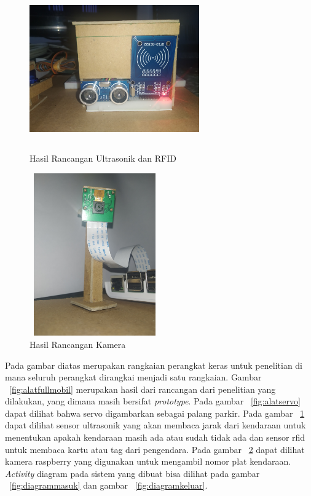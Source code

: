 \begin{figure} [H]
    \includegraphics[height=7cm, width=0.65\textwidth, center]{images/alat-ultra&rfid.jpg}
    \caption{Hasil Rancangan Ultrasonik dan RFID}
    \label{fig:alatultrarfid}
\end{figure}

\begin{figure} [H]
    \includegraphics[height=7cm, width=0.5\textwidth, center]{images/alat-kamera.jpg}
    \caption{Hasil Rancangan Kamera}
    \label{fig:alatkamera}
\end{figure}

Pada gambar diatas merupakan rangkaian perangkat keras untuk penelitian di mana seluruh perangkat dirangkai menjadi satu rangkaian.  Gambar ~\ref{fig:alatfullmobil} merupakan hasil dari rancangan dari penelitian yang dilakukan, yang dimana masih bersifat \textit{prototype}. Pada gambar ~\ref{fig:alatservo} dapat dilihat bahwa servo digambarkan sebagai palang parkir. Pada gambar ~\ref{fig:alatultrarfid} dapat dilihat sensor ultrasonik yang akan membaca jarak dari kendaraan untuk menentukan apakah kendaraan masih ada atau sudah tidak ada dan sensor rfid untuk membaca kartu atau tag dari pengendara. Pada gambar ~\ref{fig:alatkamera} dapat dilihat kamera raspberry yang digunakan untuk mengambil nomor plat kendaraan. \textit{Activity} diagram pada sistem yang dibuat bisa dilihat pada gambar ~\ref{fig:diagrammasuk} dan gambar ~\ref{fig:diagramkeluar}.

